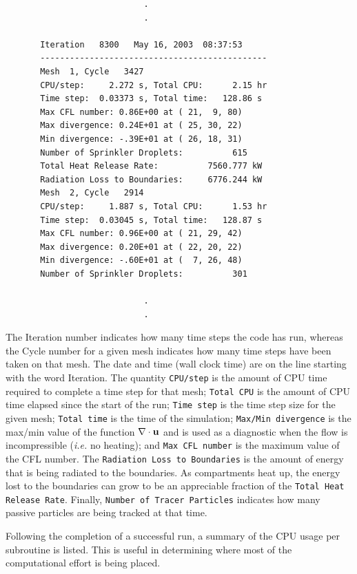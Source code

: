 \documentclass[11pt]{book}
\newcommand{\ct}{\tt\small}
\newcommand{\bu}{{\bf u}}
\begin{document}
\footnotesize
\begin{verbatim}
                            .
                            .

       Iteration   8300   May 16, 2003  08:37:53
       ----------------------------------------------
       Mesh  1, Cycle   3427
       CPU/step:     2.272 s, Total CPU:      2.15 hr
       Time step:  0.03373 s, Total time:   128.86 s
       Max CFL number: 0.86E+00 at ( 21,  9, 80)
       Max divergence: 0.24E+01 at ( 25, 30, 22)
       Min divergence: -.39E+01 at ( 26, 18, 31)
       Number of Sprinkler Droplets:          615
       Total Heat Release Rate:          7560.777 kW
       Radiation Loss to Boundaries:     6776.244 kW
       Mesh  2, Cycle   2914
       CPU/step:     1.887 s, Total CPU:      1.53 hr
       Time step:  0.03045 s, Total time:   128.87 s
       Max CFL number: 0.96E+00 at ( 21, 29, 42)
       Max divergence: 0.20E+01 at ( 22, 20, 22)
       Min divergence: -.60E+01 at (  7, 26, 48)
       Number of Sprinkler Droplets:          301

                            .
                            .
\end{verbatim}
\normalsize
The Iteration number indicates how many time steps the code has run, whereas the
Cycle number for a given mesh indicates how many time steps have been taken on that
mesh. The date and time (wall clock time) are on the line starting with the word
Iteration. The quantity {\ct CPU/step} is the amount of CPU time required to complete
a time step for that mesh; {\ct Total CPU} is the amount of CPU time elapsed since the
start of the run; {\ct Time step} is the time step size for the given mesh;
{\ct Total time} is the time of the simulation;
{\ct Max/Min divergence} is the max/min value of the
function $\nabla \cdot \bu$ and is used as a diagnostic when the flow
is incompressible ({\em i.e.} no heating); and {\ct Max CFL number} is the
maximum value of the CFL number. The {\ct Radiation Loss to Boundaries} is the
amount of energy that is being radiated to the boundaries. As compartments
heat up, the energy lost to the boundaries can grow to be an appreciable
fraction of the {\ct Total Heat Release Rate}. Finally, {\ct Number of Tracer Particles} indicates
how many passive particles are being tracked at that time.

Following the completion of a successful run, a summary of the CPU
usage per subroutine is listed. This is useful in determining where
most of the computational effort is being placed.
\end{document}
